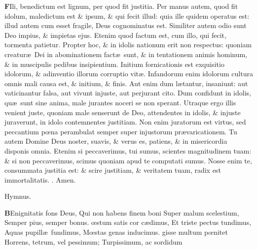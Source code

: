 \documentclass[letter,11pt]{book}
\makeatletter
\DeclareRobustCommand{\Rbar}{\vers@resp{0pt}{R}}
\newcommand{\vers@resp@sym}{\raisebox{0.2ex}{\rotatebox[origin=c]{-20}{$\m@th\rceil$}}}
\newcommand{\vers@resp}[2]{%
  {\ooalign{\hidewidth\kern#1\vers@resp@sym\hidewidth\cr#2\cr}}%
}%
\def\R{\color{Red} \Rbar . \color{black}}
\makeatother
\begin{document}
\begin{multicols*}{2}
\lettrine[lines=2]{\bfseries \color{Red} F}{}Ili, benedictum est lignum, per quod fit justitia. Per manus autem, quod fit idolum, maledictum est \& ipsum, \& qui fecit illud: quia ille quidem operatus est: illud autem cum esset fragile, Deus cognominatus est. Similiter autem odio sunt Deo impius, \& impietas ejus. Etenim quod factum est, cum illo, qui fecit, tormenta patietur. Propter hoc, \& in idolis nationum erit non respectus: quoniam creatur\ae \ Dei in abominationem fact\ae \ sunt, \& in tentationem animis hominum, \& in muscipulis pedibus insipientium. Initium fornicationis est exquisitio idolorum, \& adinventio illorum corruptio vit\ae . Infandorum enim idolorum cultura omnis mali causa est, \& initium, \& finis. Aut enim dum l\ae tantur, insaniunt: aut vaticinantur falsa, aut vivunt injuste, aut perjurant cito. Dum confidunt in idolis, qu\ae \ sunt sine anima, male jurantes noceri se non sperant. Utraque ergo illis venient juste, quoniam male senserunt de Deo, attendentes in idolis, \& injuste juraverunt, in idolo contemnentes justitiam. Non enim juratorum est virtus, sed peccantium p\oe na perambulat semper super injustorum pr\ae varicationem. Tu autem Domine Deus noster, suavis, \& verus es, patiens, \& in misericordia disponis omnia. Etenim si peccaverimus, tui sumus, scientes magnitudinem tuam: \& si non peccaverimus, scimus quoniam apud te computati sumus. Nosse enim te, consummata justitia est: \& scire justitiam, \& veritatem tuam, radix est immortalitatis. \R Amen.
\vspace{-.5em} \begin{center} \color{Red} Hymnus. \color{black} \end{center} \vspace{-.5em}
\lettrine[lines=2]{\bfseries \color{Red} B}{}Enignitatis fons Deus,
\newline Qui non habens finem boni
\newline \indent Super malum scelestium,
\newline \indent Semper pius, semper bonus.
\oe stum satis cor c\ae dimus,
\newline \indent Et triste pectus tundimus,
\newline \indent Aquas pupill\ae \ fundimus,
\newline \indent M\oe stas genas inducimus.
gisse multum p\oe nitet
\newline \indent Horrens, tetrum, vel pessimum;
\newline \indent Turpissimum, ac sordidum

\end{multicols*}
\end{document}
